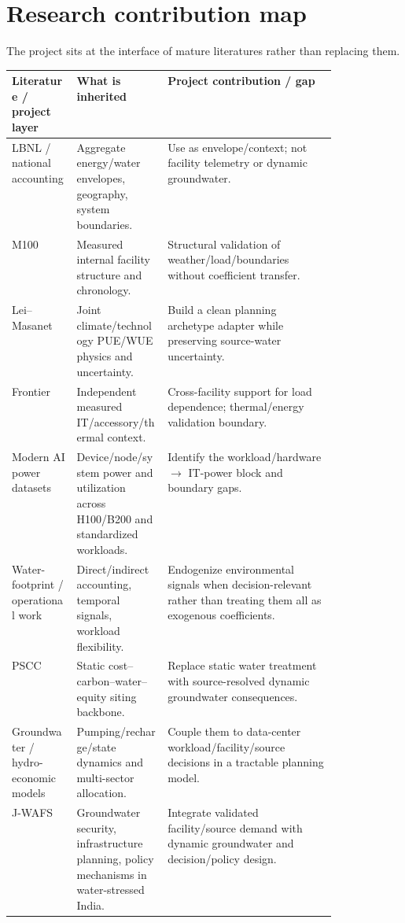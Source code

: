 \documentclass[11pt]{article}
\begin{document}
\section{Research contribution map}

The project sits at the interface of mature literatures rather than replacing them.

\begin{center}
\scriptsize
\begin{tabularx}{\linewidth}{@{}p{0.20\linewidth}p{0.28\linewidth}Y@{}}
\toprule
\textbf{Literature / project layer} & \textbf{What is inherited} & \textbf{Project contribution / gap} \\
\midrule
LBNL / national accounting \cite{lbnl,siddik} & Aggregate energy/water envelopes, geography, system boundaries. & Use as envelope/context; not facility telemetry or dynamic groundwater. \\
M100 \cite{m100} & Measured internal facility structure and chronology. & Structural validation of weather/load/boundaries without coefficient transfer. \\
Lei--Masanet \cite{lei2022} & Joint climate/technology PUE/WUE physics and uncertainty. & Build a clean planning archetype adapter while preserving source-water uncertainty. \\
Frontier \cite{frontier} & Independent measured IT/accessory/thermal context. & Cross-facility support for load dependence; thermal/energy validation boundary. \\
Modern AI power datasets & Device/node/system power and utilization across H100/B200 and standardized workloads. & Identify the workload/hardware $\rightarrow$ IT-power block and boundary gaps. \\
Water-footprint / operational work \cite{li,gupta,waterwise} & Direct/indirect accounting, temporal signals, workload flexibility. & Endogenize environmental signals when decision-relevant rather than treating them all as exogenous coefficients. \\
PSCC \cite{pscc} & Static cost--carbon--water--equity siting backbone. & Replace static water treatment with source-resolved dynamic groundwater consequences. \\
Groundwater / hydro-economic models \cite{modflow,harou} & Pumping/recharge/state dynamics and multi-sector allocation. & Couple them to data-center workload/facility/source decisions in a tractable planning model. \\
J-WAFS \cite{jwa} & Groundwater security, infrastructure planning, policy mechanisms in water-stressed India. & Integrate validated facility/source demand with dynamic groundwater and decision/policy design. \\
\bottomrule
\end{tabularx}
\end{center}
\end{document}
